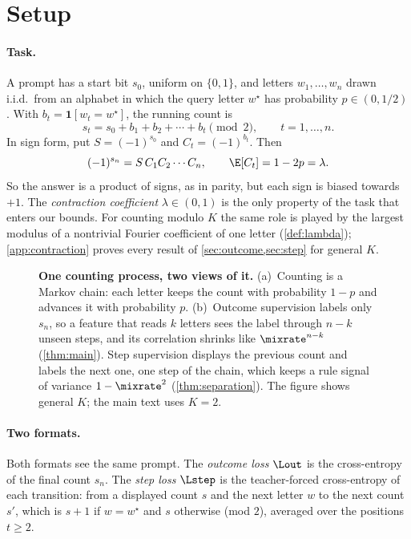 \section{Setup}
\label{sec:setup}
\label{sec:setting}

\paragraph{Task.} A prompt has a start bit $s_0$, uniform on $\{0,1\}$, and letters $w_1,\ldots,w_n$ drawn
i.i.d.\ from an alphabet in which the query letter $w^\star$ has probability $p\in(0,1/2)$. With
$b_t=\mathbf 1[w_t=w^\star]$, the running count is
\[
 s_t=s_0+b_1+b_2+\cdots+b_t\pmod 2,\qquad t=1,\ldots,n .
\]
In sign form, put $S=(-1)^{s_0}$ and $C_t=(-1)^{b_t}$. Then
\begin{equation}
 (-1)^{s_n}=S\,C_1C_2\cdots C_n,\qquad \E[C_t]=1-2p=\lambda .
 \label{eq:tracking}
\end{equation}
So the answer is a product of signs, as in parity, but each sign is biased towards $+1$. The
\emph{contraction coefficient} $\lambda\in(0,1)$ is the only property of the task that enters our
bounds. For counting modulo $K$ the same role is played by the largest modulus of a nontrivial
Fourier coefficient of one letter (\cref{def:lambda}); \cref{app:contraction} proves every result of
\cref{sec:outcome,sec:step} for general $K$.

\begin{figure}[t]
\centering
\resizebox{\linewidth}{!}{}
\caption{\textbf{One counting process, two views of it.}
(a)~Counting is a Markov chain: each letter keeps the count with probability $1-p$ and advances it with probability $p$.
(b)~Outcome supervision labels only $s_n$, so a feature that reads $k$ letters sees the label through
$n-k$ unseen steps, and its correlation shrinks like $\mixrate^{n-k}$ (\cref{thm:main}). Step supervision
displays the previous count and labels the next one, one step of the chain, which keeps a rule signal of variance $1-\mixrate^2$
(\cref{thm:separation}). The figure shows general $K$; the main text uses $K=2$.}
\label{fig:chain}
\end{figure}

\paragraph{Two formats.} Both formats see the same prompt. The \emph{outcome loss} $\Lout$ is the
cross-entropy of the final count $s_n$. The \emph{step loss} $\Lstep$ is the teacher-forced cross-entropy of
each transition: from a displayed count $s$ and the next letter $w$ to the next count $s'$, which is $s+1$ if $w=w^\star$
and $s$ otherwise (mod $2$), averaged over the positions $t\ge2$.

